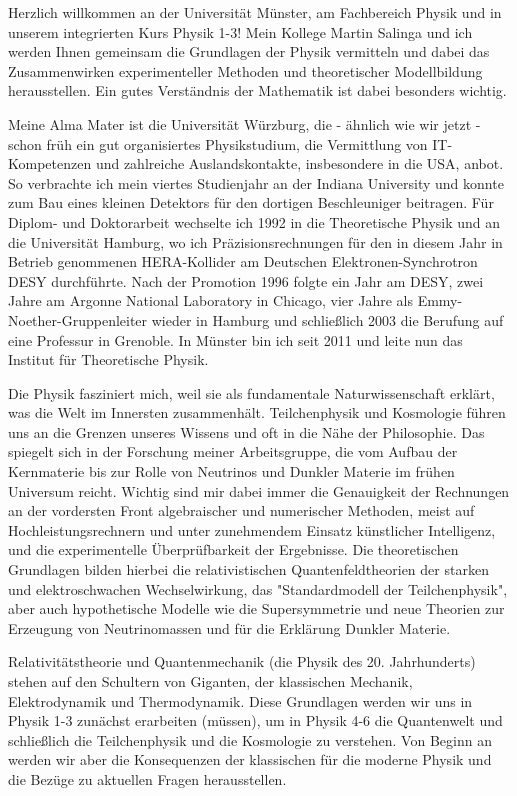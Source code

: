 \begin{multicols}{2}
Herzlich willkommen an der Universität Münster, am Fachbereich Physik und in unserem integrierten Kurs Physik 1-3! Mein Kollege Martin Salinga und ich werden Ihnen gemeinsam die Grundlagen der Physik vermitteln und dabei das Zusammenwirken experimenteller Methoden und theoretischer Modellbildung herausstellen. Ein gutes Verständnis der Mathematik ist dabei besonders wichtig. 

Meine Alma Mater ist die Universität Würzburg, die - ähnlich wie wir jetzt - schon früh ein gut organisiertes Physikstudium, die Vermittlung von IT-Kompetenzen und zahlreiche Auslandskontakte, insbesondere in die USA, anbot. So verbrachte ich mein viertes Studienjahr an der Indiana University und konnte zum Bau eines kleinen Detektors für den dortigen Beschleuniger beitragen. Für Diplom- und Doktorarbeit wechselte ich 1992 in die Theoretische Physik und an die Universität Hamburg, wo ich Präzisionsrechnungen für den in diesem Jahr in Betrieb genommenen HERA-Kollider am Deutschen Elektronen-Synchrotron DESY durchführte. Nach der Promotion 1996 folgte ein Jahr am DESY, zwei Jahre am Argonne National Laboratory in Chicago, vier Jahre als Emmy-Noether-Gruppenleiter wieder in Hamburg und schließlich 2003 die Berufung auf eine Professur in Grenoble. In Münster bin ich seit 2011 und leite nun das Institut für Theoretische Physik. 

Die Physik fasziniert mich, weil sie als fundamentale Naturwissenschaft erklärt, was die Welt im Innersten zusammenhält. Teilchenphysik und Kosmologie führen uns an die Grenzen unseres Wissens und oft in die Nähe der Philosophie. Das spiegelt sich in der Forschung meiner Arbeitsgruppe, die vom Aufbau der Kernmaterie bis zur Rolle von Neutrinos und Dunkler Materie im frühen Universum reicht. Wichtig sind mir dabei immer die Genauigkeit der Rechnungen an der vordersten Front algebraischer und numerischer Methoden, meist auf Hochleistungsrechnern und unter zunehmendem Einsatz künstlicher Intelligenz, und die experimentelle Überprüfbarkeit der Ergebnisse. Die theoretischen Grundlagen bilden hierbei die relativistischen Quantenfeldtheorien der starken und elektroschwachen Wechselwirkung, das "Standardmodell der Teilchenphysik", aber auch hypothetische Modelle wie die Supersymmetrie und neue Theorien zur Erzeugung von Neutrinomassen und für die Erklärung Dunkler Materie. 

Relativitätstheorie und Quantenmechanik (die Physik des 20. Jahrhunderts) stehen auf den Schultern von Giganten, der klassischen Mechanik, Elektrodynamik und Thermodynamik. Diese Grundlagen werden wir uns in Physik 1-3 zunächst erarbeiten (müssen), um in Physik 4-6 die Quantenwelt und schließlich die Teilchenphysik und die Kosmologie zu verstehen. Von Beginn an werden wir aber die Konsequenzen der klassischen für die moderne Physik und die Bezüge zu aktuellen Fragen herausstellen. 


\end{multicols}
